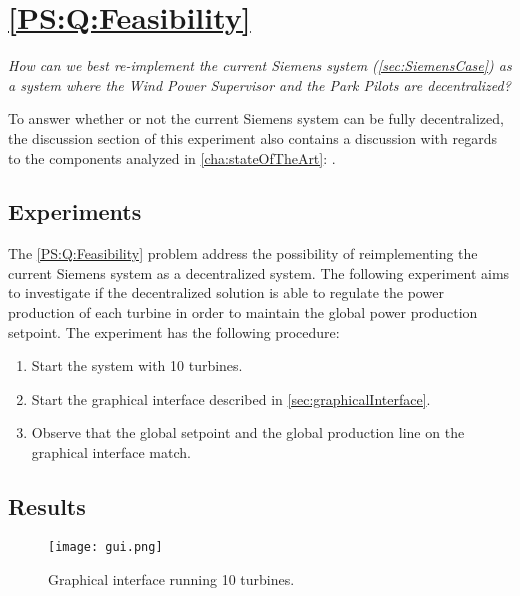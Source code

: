 
\section{\ref{PS:Q:Feasibility}}

\textit{How can we best re-implement the current Siemens system (\cref{sec:SiemensCase}) as a system where the Wind Power Supervisor and the Park Pilots are decentralized?}\newline\newline

\noindent To answer whether or not the current Siemens system can be fully decentralized, the discussion section of this experiment also contains a discussion with regards to the components analyzed in \cref{cha:stateOfTheArt}: . 


\subsection{Experiments}

The \ref{PS:Q:Feasibility} problem address the possibility of reimplementing the current Siemens system as a decentralized system. The following experiment aims to investigate if the decentralized solution is able to regulate the power production of each turbine in order to maintain the global power production setpoint.
%
The experiment has the following procedure:
\begin{enumerate}
	\item Start the system with 10 turbines.
	\item Start the graphical interface described in \cref{sec:graphicalInterface}.
	\item Observe that the global setpoint and the global production line on the graphical interface match.
\end{enumerate}

\subsection{Results}
\label{sec:exp:feasibility}
\begin{figure} [!h]
	\centering
	\texttt{[image: gui.png]} 
	\caption[Graphical interface running 10 turbines]{
		\label{fig:graphicalInterface} 
		\footnotesize{%
			Graphical interface running 10 turbines.
		}
	}
\end{figure}

